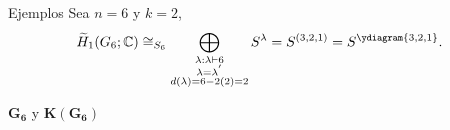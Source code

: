 \documentclass[final,xcolor=svgnames]{beamer}
\begin{document}
\begin{frame}{}
\begin{columns}
\begin{column}{0.5\textwidth}
\begin{block}{Ejemplos}
        Sea $n=6$ y $k=2$,
      \begin{equation*}
        \widetilde H_{1}(G_{6};\mathbb{C})\cong_{S_{6}}\bigoplus_{\substack{\lambda:\lambda\vdash 6\\
            \lambda=\lambda^{'}\\d(\lambda)=6-2(2)=2}} S^{\lambda}=S^{(3,2,1)}=S^{\ydiagram{3,2,1}}.
      \end{equation*}
    \end{block}
      
\begin{block}{$\boldsymbol{G_6}$ y $\boldsymbol{K(G_6)}$}
  \begin{minipage}{0.53\linewidth}    
    \centering


\end{minipage}
\end{block}
\end{column}
\end{columns}
\end{frame}
\end{document}
